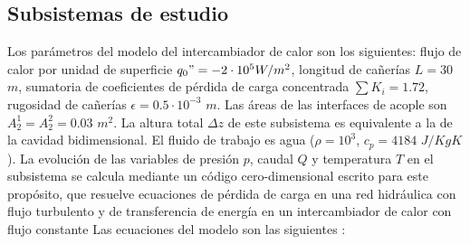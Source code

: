 \subsection*{Subsistemas de estudio}
Los parámetros del modelo del intercambiador de calor son los siguientes:
flujo de calor por unidad de superficie $q_0"=-2\cdot 10^5 W/m^2$, 
longitud de cañerías $L=30$ $m$, 
sumatoria de coeficientes de pérdida de carga concentrada $\sum K_i=1.72$, 
rugosidad de cañerías $\epsilon=0.5\cdot 10^{-3}$ $m$.
Las áreas de las interfaces de acople son $A_2^1=A_2^2=0.03$ $m^2$.
La altura total $\Delta z$ de este subsistema es equivalente a la de la cavidad bidimensional.
El fluido de trabajo es agua ($\rho=10^3$, $c_p=4184$ $J/KgK$).
La evolución de las variables de presión $p$, caudal $Q$ y temperatura $T$ en el subsistema se calcula mediante un código cero-dimensional escrito para este propósito,
que resuelve ecuaciones de pérdida de carga en una red hidráulica con flujo turbulento 
y de transferencia de energía en un intercambiador de calor con flujo constante 
Las ecuaciones del modelo son las siguientes \cite{iedelchik} \cite{kays}:

